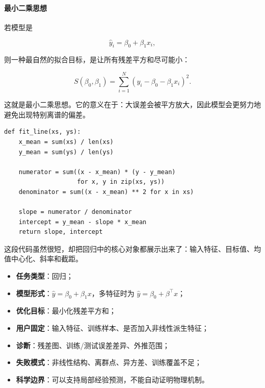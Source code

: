 \paragraph{最小二乘思想}

若模型是

\[
\hat{y}_i = \beta_0 + \beta_1 x_i,
\]

则一种最自然的拟合目标，是让所有残差平方和尽可能小：

\[
S(\beta_0, \beta_1) = \sum_{i=1}^{N}
\left(y_i - \beta_0 - \beta_1 x_i\right)^2.
\]

这就是最小二乘思想。它的意义在于：大误差会被平方放大，因此模型会更努力地避免出现特别离谱的偏差。

\begin{examplebox}[最小线性回归]
\begin{lstlisting}[style=pythonstyle]
def fit_line(xs, ys):
    x_mean = sum(xs) / len(xs)
    y_mean = sum(ys) / len(ys)

    numerator = sum((x - x_mean) * (y - y_mean)
                    for x, y in zip(xs, ys))
    denominator = sum((x - x_mean) ** 2 for x in xs)

    slope = numerator / denominator
    intercept = y_mean - slope * x_mean
    return slope, intercept
\end{lstlisting}
\end{examplebox}

这段代码虽然很短，却把回归中的核心对象都展示出来了：输入特征、目标值、均值中心化、斜率和截距。

\begin{examplebox}
\begin{itemize}
    \item \textbf{任务类型}：回归；
    \item \textbf{模型形式}：\(\hat{y}=\beta_0+\beta_1 x\)，多特征时为 \(\hat{y}=\beta_0+\beta^\top x\)；
    \item \textbf{优化目标}：最小化残差平方和；
    \item \textbf{用户固定}：输入特征、训练样本、是否加入非线性派生特征；
    \item \textbf{诊断}：残差图、训练/测试误差差异、外推范围；
    \item \textbf{失败模式}：非线性结构、离群点、异方差、训练覆盖不足；
    \item \textbf{科学边界}：可以支持局部经验预测，不能自动证明物理机制。
\end{itemize}
\end{examplebox}

